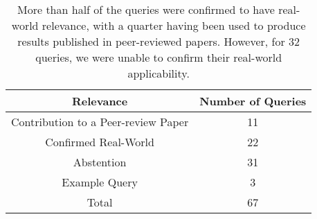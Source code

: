 \begin{table}
    \begin{center}
        \begin{tabular}{|c|c|}
            \hline
            Relevance & Number of Queries \\
            \hline\hline
            Contribution to a Peer-review Paper & 11 \\
            \hline
            Confirmed Real-World                & 22 \\
            \hline
            Abstention                          & 31 \\
            \hline
            Example Query                       & 3 \\
            \hline\hline
            Total                               & 67 \\
            \hline
        \end{tabular}
    \end{center}
    \caption{
            More than half of the queries were confirmed to have real-world relevance, with a quarter having been used to produce results published in peer-reviewed papers.
            However, for 32 queries, we were unable to confirm their real-world applicability.
        }
    \label{tab:queryRelevance}
\end{table}   